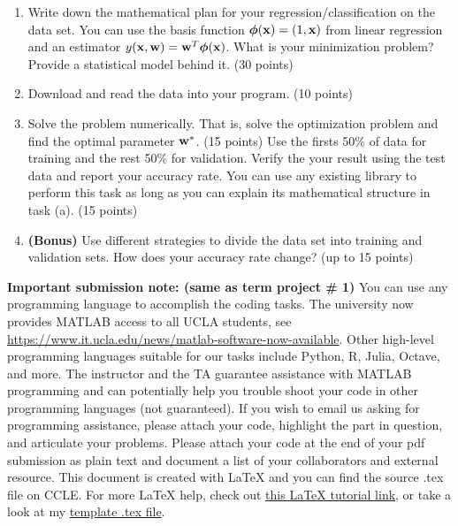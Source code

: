 \documentclass[12pt,a4paper]{article}
\renewcommand{\v}[1]{\ifmmode\mathbf{#1}\fi}
\begin{document}
\begin{enumerate}[label=(\alph*)]
\item Write down the mathematical plan for your regression/classification on the data set. You can use the basis function $\boldsymbol\phi (\v x) = (1, \v x)$ from linear regression and an estimator $y(\v x, \v w) = \v w^T \boldsymbol\phi(\v x)$. What is your minimization problem? Provide a statistical model behind it. (30 points)

\item Download and read the data into your program. (10 points)

\item Solve the problem numerically. That is, solve the optimization problem and find the optimal parameter $\v w^\ast$. (15 points) Use the firsts 50\% of data for training and the rest 50\% for validation. Verify the your result using the test data and report your accuracy rate. You can use any existing library to perform this task as long as you can explain its mathematical structure in task (a). (15 points)

\item \textbf{(Bonus)} Use different strategies to divide the data set into training and validation sets. How does your accuracy rate change? (up to 15 points)
\end{enumerate}
%
\textbf{Important submission note: (same as term project \# 1)}
You can use any programming language to accomplish the coding tasks. The university now provides MATLAB access to all UCLA students, see \href{https://www.it.ucla.edu/news/matlab-software-now-available}{https://www.it.ucla.edu/news/matlab-software-now-available}. Other high-level programming languages suitable for our tasks include Python, R, Julia, Octave, and more. The instructor and the TA guarantee assistance with MATLAB programming and can potentially help you trouble shoot your code in other programming languages (not guaranteed). If you wish to email us asking for programming assistance, please attach your code, highlight the part in question, and articulate your problems. Please attach your code at the end of your pdf submission as plain text and document a list of your collaborators and external resource. This document is created with \LaTeX{} and you can find the source .tex file on CCLE. For more \LaTeX{} help, check out \href{https://www.maths.tcd.ie/~dwilkins/LaTeXPrimer/}{this \LaTeX{} tutorial link}, or take a look at my \href{https://raw.githubusercontent.com/evastgh/ps/master/template.tex}{template .tex file}.
\end{document}
